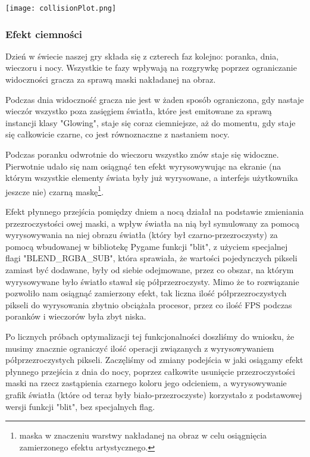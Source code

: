 \documentclass{article}
\begin{document}
\begin{center}
     \texttt{[image: collisionPlot.png]}
\end{center}

\subsubsection{Efekt ciemności}
Dzień w świecie naszej gry składa się z czterech faz kolejno: poranka, dnia, wieczoru i nocy. Wszystkie te fazy wpływają na rozgrywkę poprzez ograniczanie widoczności gracza za sprawą maski nakładanej na obraz.

Podczas dnia widoczność gracza nie jest w żaden sposób ograniczona, gdy nastaje wieczór wszystko poza zasięgiem światła, które jest emitowane za sprawą instancji klasy "Glowing", staje się coraz ciemniejsze, aż do momentu, gdy staje się całkowicie czarne, co jest równoznaczne z nastaniem nocy.

Podczas poranku odwrotnie do wieczoru wszystko znów staje się widoczne. Pierwotnie udało się nam osiągnąć ten efekt wyrysowywując na ekranie (na którym wszystkie elementy świata były już wyrysowane, a interfejs użytkownika jeszcze nie) czarną maskę\footnote{maska w znaczeniu warstwy nakładanej na obraz w celu osiągnięcia zamierzonego efektu artystycznego.}.

Efekt płynnego przejścia pomiędzy dniem a nocą działał na podstawie zmieniania przezroczystości owej maski, a wpływ światła na nią był symulowany za pomocą wyrysowywania na niej obrazu światła (który był czarno-przezroczysty) za pomocą wbudowanej w bibliotekę Pygame funkcji "blit", z użyciem specjalnej flagi "BLEND\_RGBA\_SUB", która sprawiała, że wartości pojedynczych pikseli zamiast być dodawane, były od siebie odejmowane, przez co obszar, na którym wyrysowywane było światło stawał się półprzezroczysty. Mimo że to rozwiązanie pozwoliło nam osiągnąć zamierzony efekt, tak liczna ilość półprzezroczystych pikseli do wyrysowania zbytnio obciążała procesor, przez co ilość FPS podczas poranków i wieczorów była zbyt niska.

Po licznych próbach optymalizacji tej funkcjonalności doszliśmy do wniosku, że musimy znacznie ograniczyć ilość operacji związanych z wyrysowywaniem półprzezroczystych pikseli. Zaczęliśmy od zmiany podejścia w jaki osiągamy efekt płynnego przejścia z dnia do nocy, poprzez całkowite usunięcie przezroczystości maski na rzecz zastąpienia czarnego koloru jego odcieniem, a wyrysowywanie grafik światła (które od teraz były biało-przezroczyste) korzystało z podstawowej wersji funkcji "blit", bez specjalnych flag.
\end{document}
